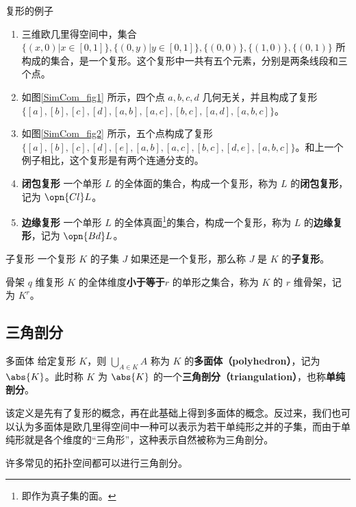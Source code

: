 \begin{example}{复形的例子}
\begin{enumerate}
\item 三维欧几里得空间中，集合 $\{(x, 0)|x\in[0,1]\}, \{(0, y)|y\in[0, 1]\}, \{(0, 0)\}, \{(1, 0)\}, \{(0, 1)\}$ 所构成的集合，是一个复形。这个复形中一共有五个元素，分别是两条线段和三个点。
\item 如图\autoref{SimCom_fig1} 所示，四个点 $a, b, c, d$ 几何无关，并且构成了复形 $\{[a], [b], [c], [d], [a, b], [a, c], [b, c], [a, d], [a, b, c]\}$。
\item 如图\autoref{SimCom_fig2} 所示，五个点构成了复形 $\{[a], [b], [c], [d], [e], [a, b], [a, c], [b, c], [d, e], [a, b, c]\}$。和上一个例子相比，这个复形是有两个连通分支的。
\item \textbf{闭包复形} 一个单形 $L$ 的全体面的集合，构成一个复形，称为 $L$ 的\textbf{闭包复形}，记为 $\opn{Cl} L$。
\item \textbf{边缘复形} 一个单形 $L$ 的全体真面\footnote{即作为真子集的面。}的集合，构成一个复形，称为 $L$ 的\textbf{边缘复形}，记为 $\opn{Bd} L$。
\end{enumerate}
\end{example}

\begin{definition}{子复形}
一个复形 $K$ 的子集 $J$ 如果还是一个复形，那么称 $J$ 是 $K$ 的\textbf{子复形}。
\end{definition}

\begin{definition}{骨架}
$q$ 维复形 $K$ 的全体维度\textbf{小于等于}$r$ 的单形之集合，称为 $K$ 的 $r$ 维骨架，记为 $K^r$。
\end{definition}

\subsection{三角剖分}

\begin{definition}{多面体}
给定复形 $K$，则 $\bigcup\limits_{A\in K}A$ 称为 $K$ 的\textbf{多面体（polyhedron）}，记为 $\abs{K}$。此时称 $K$ 为 $\abs{K}$ 的一个\textbf{三角剖分（triangulation）}，也称\textbf{单纯剖分}。
\end{definition}

该定义是先有了复形的概念，再在此基础上得到多面体的概念。反过来，我们也可以认为多面体是欧几里得空间中一种可以表示为若干单纯形之并的子集，而由于单纯形就是各个维度的“三角形”，这种表示自然被称为三角剖分。

许多常见的拓扑空间都可以进行三角剖分。

